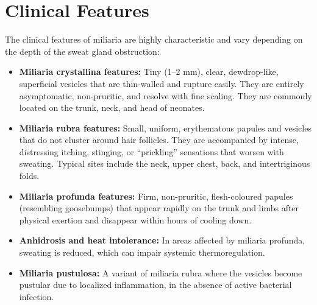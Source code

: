 \section*{Clinical Features}
The clinical features of miliaria are highly characteristic and vary depending on the depth of the sweat gland obstruction:
\begin{itemize}
    \item \textbf{Miliaria crystallina features:} Tiny (1--2 mm), clear, dewdrop-like, superficial vesicles that are thin-walled and rupture easily. They are entirely asymptomatic, non-pruritic, and resolve with fine scaling. They are commonly located on the trunk, neck, and head of neonates.
    \item \textbf{Miliaria rubra features:} Small, uniform, erythematous papules and vesicles that do not cluster around hair follicles. They are accompanied by intense, distressing itching, stinging, or ``prickling'' sensations that worsen with sweating. Typical sites include the neck, upper chest, back, and intertriginous folds.
    \item \textbf{Miliaria profunda features:} Firm, non-pruritic, flesh-coloured papules (resembling goosebumps) that appear rapidly on the trunk and limbs after physical exertion and disappear within hours of cooling down.
    \item \textbf{Anhidrosis and heat intolerance:} In areas affected by miliaria profunda, sweating is reduced, which can impair systemic thermoregulation.
    \item \textbf{Miliaria pustulosa:} A variant of miliaria rubra where the vesicles become pustular due to localized inflammation, in the absence of active bacterial infection.
\end{itemize}

